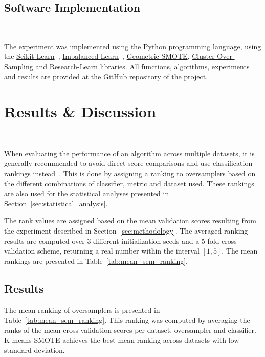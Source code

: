\documentclass[authoryear,preprint,12pt]{elsarticle}
\begin{document}
\begin{linenumbers}
\subsection{Software Implementation}~\label{sec:implementation}

The experiment was implemented using the Python programming language, using the
\href{https://scikit-learn.org/stable/}{Scikit-Learn}~\citep{Pedregosa2011},
\href{https://imbalanced-learn.org/en/stable/}{Imbalanced-Learn}~\citep{JMLR:v18:16-365},
\href{https://geometric-smote.readthedocs.io/en/latest/?badge=latest}{Geometric-SMOTE},
\href{https://cluster-over-sampling.readthedocs.io/en/latest/?badge=latest}{Cluster-Over-Sampling}
and \href{https://research-learn.readthedocs.io/en/latest/?badge=latest}{Research-Learn} libraries.
All functions, algorithms, experiments and results are provided at the
\href{https://github.com/AlgoWit/publications}{GitHub
repository of the project}.

\section{Results \& Discussion}~\label{sec:results}

When evaluating the performance of an algorithm across multiple datasets, it
is generally recommended to avoid direct score comparisons and use
classification rankings instead~\citep{demvsar2006}. This is done by assigning
a ranking to oversamplers based on the different combinations of classifier,
metric and dataset used. These rankings are also used for the statistical
analyses presented in Section~\ref{sec:statistical_analysis}.

The rank values are assigned based on the mean validation scores resulting
from the experiment described in Section~\ref{sec:methodology}. The averaged
ranking results are computed over 3 different initialization seeds and a 5
fold cross validation scheme, returning a real number within the interval
$[1,5]$. The mean rankings are presented in Table~\ref{tab:mean_sem_ranking}.

\subsection{Results}

The mean ranking of oversamplers is presented in
Table~\ref{tab:mean_sem_ranking}. This ranking was computed by averaging the
ranks of the mean cross-validation scores per dataset, oversampler and
classifier. K-means SMOTE achieves the best mean ranking across datasets with
low standard deviation.


\end{linenumbers}
\end{document}
